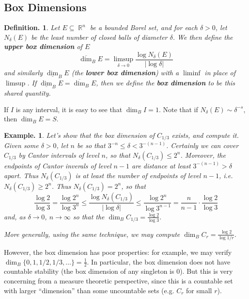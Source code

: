 \documentclass[11pt, a4paper]{memoir}
\DeclareMathOperator{\R}{{\mathbb{R}}}
\theoremstyle{change}
\theoremstyle{plain}
\theoremstyle{nonumberplain}
\newtheorem{definition}{Definition.}
\newtheorem{example}{Example.}
\newcommand{\defn}[1]{{\boldmath\bfseries #1}}
\newcommand{\bdim}{\ensuremath{\dim_B}}
\newcommand{\ubdim}{\ensuremath{\overline{\dim}_B}}
\newcommand{\lbdim}{\ensuremath{\underline{\dim}_B}}
\numberwithin{equation}{section}
\begin{document}
\subsection{Box Dimensions}
\begin{definition}
    Let $E\subseteq\R^n$ be a bounded Borel set, and for each $\delta>0$, let $N_\delta(E)$ be the least number of closed balls of diameter $\delta$.
    We then define the \defn{upper box dimension} of $E$
    \begin{equation*}
        \ubdim E=\limsup_{\delta\to 0}\frac{\log N_\delta(E)}{|\log\delta|}
    \end{equation*}
    and similarly $\lbdim E$ (the \defn{lower box dimension}) with a $\liminf$ in place of $\limsup$.
    If $\lbdim E=\ubdim E$, then we define the \defn{box dimension} to be this shared quantity.
\end{definition}
If $I$ is any interval, it is easy to see that $\bdim I=1$.
Note that if $N_\delta(E)\sim\delta^{-s}$, then $\bdim E=S$.
\begin{example}
    Let's show that the box dimension of $C_{1/3}$ exists, and compute it.
    Given some $\delta>0$, let $n$ be so that $3^{-n}\leq\delta<3^{-(n-1)}$.
    Certainly we can cover $C_{1/3}$ by Cantor intervals of level $n$, so that $N_\delta(C_{1/3})\leq 2^n$.
    Moreover, the endpoints of Cantor inverals of level $n-1$ are distance at least $3^{-(n-1)}>\delta$ apart.
    Thus $N_\delta(C_{1/3})$ is at least the number of endpoints of level $n-1$, i.e. $N_\delta(C_{1/3})\geq 2^n$.
    Thus $N_\delta(C_{1/3})=2^n$, so that
    \begin{equation*}
        \frac{\log 2}{\log 3}=\frac{\log 2^n}{\log 3^n}\leq\frac{\log N_\delta(C_{1/3})}{|\log\delta|}\leq\frac{\log 2^n}{\log 3^{n-1}}=\frac{n}{n-1}\cdot\frac{\log 2}{\log 3}
    \end{equation*}
    and, as $\delta\to 0$, $n\to\infty$ so that the $\bdim C_{1/3}=\frac{\log 2}{\log 3}$.

    More generally, using the same technique, we may compute $\bdim C_r=\frac{\log 2}{\log 1/r}$.
\end{example}
However, the box dimension has poor properties: for example, we may verify $\bdim\{0,1,1/2,1/3,\ldots\}=\frac{1}{2}$.
In particular, the box dimension does not have countable stability (the box dimension of any singleton is 0).
But this is very concerning from a measure theoretic perspective, since this is a countable set with larger ``dimension'' than some uncountable sets (e.g. $C_r$ for small $r$).
\end{document}
